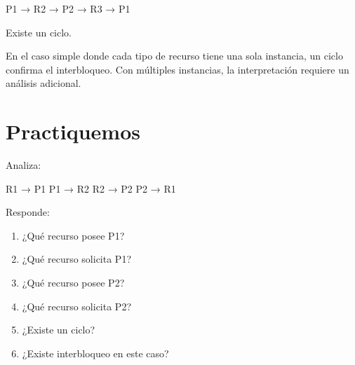 \documentclass[
  spanish,
  letterpaper,
]{scrbook}
\newenvironment{Shaded}{\begin{snugshade}}{\end{snugshade}}
\newcommand{\NormalTok}[1]{\textcolor[rgb]{0.00,0.23,0.31}{#1}}
\providecommand{\tightlist}{%
  \setlength{\itemsep}{0pt}\setlength{\parskip}{0pt}}
\begin{document}
\begin{Shaded}
\begin{Highlighting}[]
\NormalTok{P1 → R2 → P2 → R3 → P1}
\end{Highlighting}
\end{Shaded}

Existe un ciclo.

\begin{tcolorbox}[enhanced jigsaw, arc=.35mm, bottomrule=.15mm, bottomtitle=1mm, breakable, colback=white, colbacktitle=quarto-callout-note-color!10!white, colframe=quarto-callout-note-color-frame, coltitle=black, left=2mm, leftrule=.75mm, opacityback=0, opacitybacktitle=0.6, rightrule=.15mm, title=\textcolor{quarto-callout-note-color}{\faInfo}\hspace{0.5em}{Importante}, titlerule=0mm, toprule=.15mm, toptitle=1mm]

En el caso simple donde cada tipo de recurso tiene una sola instancia,
un ciclo confirma el interbloqueo. Con múltiples instancias, la
interpretación requiere un análisis adicional.

\end{tcolorbox}

\section{Practiquemos}\label{practiquemos}

Analiza:

\begin{Shaded}
\begin{Highlighting}[]
\NormalTok{R1 → P1}
\NormalTok{P1 → R2}
\NormalTok{R2 → P2}
\NormalTok{P2 → R1}
\end{Highlighting}
\end{Shaded}

Responde:

\begin{enumerate}
\def\labelenumi{\arabic{enumi}.}
\tightlist
\item
  ¿Qué recurso posee P1?
\item
  ¿Qué recurso solicita P1?
\item
  ¿Qué recurso posee P2?
\item
  ¿Qué recurso solicita P2?
\item
  ¿Existe un ciclo?
\item
  ¿Existe interbloqueo en este caso?
\end{enumerate}
\end{document}
